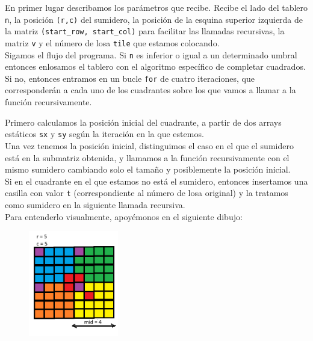 \documentclass{article}
\begin{document}
    

    En primer lugar describamos los parámetros que recibe. Recibe el lado
    del tablero \texttt{n}, la posición \texttt{(r,c)} del sumidero,
    la posición de la esquina superior izquierda de la matriz
    \texttt{(start\_row, start\_col)} para facilitar las llamadas recursivas,
    la matriz \texttt{v} y el número de losa \texttt{tile} que estamos
    colocando. \\

    Sigamos el flujo del programa. Si \texttt{n} es inferior o igual a un
    determinado umbral \texttt{} entonces enlosamos el tablero con el
    algoritmo específico de completar cuadrados. \\

    Si no, entonces entramos en un bucle \texttt{for} de cuatro iteraciones,
    que corresponderán a cada uno de los cuadrantes sobre los que vamos a
    llamar a la función recursivamente.
    
    Primero calculamos la posición inicial del cuadrante, a partir
    de dos arrays estáticos \texttt{sx} y \texttt{sy} según la iteración
    en la que estemos. \\

    Una vez tenemos la posición inicial, distinguimos el caso en el que
    el sumidero está en la submatriz obtenida, y llamamos a la función
    recursivamente con el mismo sumidero cambiando solo el tamaño y
    posiblemente la posición inicial. \\

    Si en el cuadrante en el que estamos no está el sumidero, entonces
    insertamos una casilla con valor \texttt{t} (correspondiente al número
    de losa original) y la tratamos como sumidero en la siguiente llamada
    recursiva. \\

    Para entenderlo visualmente, apoyémonos en el siguiente dibujo:
    \begin{figure}[H]
        \centering
        \includegraphics[width=0.35\textwidth]{P2/explicación2.png}
    \end{figure}
\end{document}
